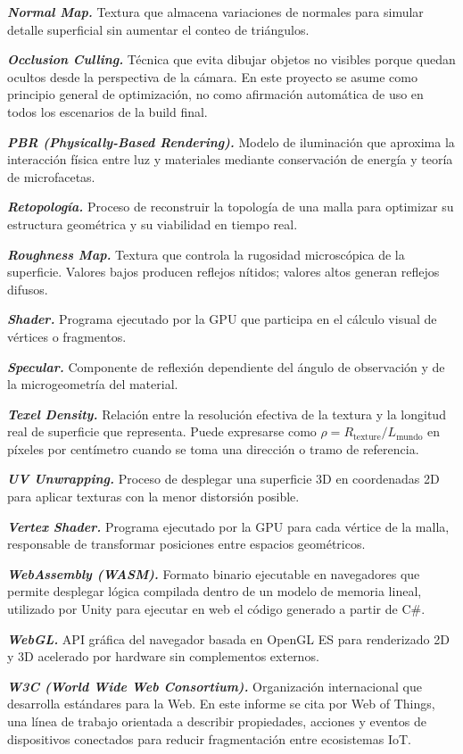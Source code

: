 \textbf{\textit{Normal Map.}} Textura que almacena variaciones de normales para simular detalle superficial sin aumentar el conteo de triángulos.

\textbf{\textit{Occlusion Culling.}} Técnica que evita dibujar objetos no visibles porque quedan ocultos desde la perspectiva de la cámara. En este proyecto se asume como principio general de optimización, no como afirmación automática de uso en todos los escenarios de la build final.

\textbf{\textit{PBR (Physically-Based Rendering).}} Modelo de iluminación que aproxima la interacción física entre luz y materiales mediante conservación de energía y teoría de microfacetas.

\textbf{\textit{Retopología.}} Proceso de reconstruir la topología de una malla para optimizar su estructura geométrica y su viabilidad en tiempo real.

\textbf{\textit{Roughness Map.}} Textura que controla la rugosidad microscópica de la superficie. Valores bajos producen reflejos nítidos; valores altos generan reflejos difusos.

\textbf{\textit{Shader.}} Programa ejecutado por la GPU que participa en el cálculo visual de vértices o fragmentos.

\textbf{\textit{Specular.}} Componente de reflexión dependiente del ángulo de observación y de la microgeometría del material.

\textbf{\textit{Texel Density.}} Relación entre la resolución efectiva de la textura y la longitud real de superficie que representa. Puede expresarse como $\rho = R_{\text{texture}} / L_{\text{mundo}}$ en píxeles por centímetro cuando se toma una dirección o tramo de referencia.

\textbf{\textit{UV Unwrapping.}} Proceso de desplegar una superficie 3D en coordenadas 2D para aplicar texturas con la menor distorsión posible.

\textbf{\textit{Vertex Shader.}} Programa ejecutado por la GPU para cada vértice de la malla, responsable de transformar posiciones entre espacios geométricos.

\textbf{\textit{WebAssembly (WASM).}} Formato binario ejecutable en navegadores que permite desplegar lógica compilada dentro de un modelo de memoria lineal, utilizado por Unity para ejecutar en web el código generado a partir de C\#.

\textbf{\textit{WebGL.}} API gráfica del navegador basada en OpenGL ES para renderizado 2D y 3D acelerado por hardware sin complementos externos.

\textbf{\textit{W3C (World Wide Web Consortium).}} Organización internacional que desarrolla estándares para la Web. En este informe se cita por Web of Things, una línea de trabajo orientada a describir propiedades, acciones y eventos de dispositivos conectados para reducir fragmentación entre ecosistemas IoT.
